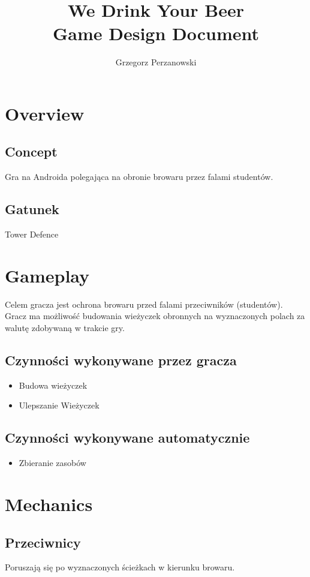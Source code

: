\documentclass[12pt]{article}
\title{%
	We Drink Your Beer\\
	\large Game Design Document}
\author{Grzegorz Perzanowski}
\begin{document}
	\maketitle
	\newpage
	\tableofcontents
	\newpage
	
\section{Overview}
\subsection{Concept}
	Gra na Androida polegająca na obronie browaru przez falami studentów.
\subsection{Gatunek}
	Tower Defence 

\newpage
\section{Gameplay}
	Celem gracza jest ochrona browaru przed falami przeciwników (studentów). Gracz ma możliwość
	budowania wieżyczek obronnych na wyznaczonych polach za walutę zdobywaną w trakcie gry.
\subsection{Czynności wykonywane przez gracza}
\begin{itemize}
	\item Budowa wieżyczek
	\item Ulepszanie Wieżyczek
\end{itemize}
\subsection{Czynności wykonywane automatycznie}
\begin{itemize}
	\item Zbieranie zasobów
\end{itemize}
	
\newpage
\section{Mechanics}
\subsection{Przeciwnicy}
	Poruszają się po wyznaczonych ścieżkach w kierunku browaru.
\end{document}
